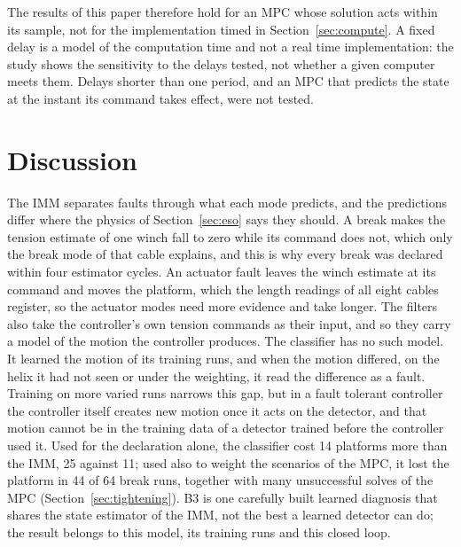 \documentclass{interact}
\begin{document}
The results of this paper therefore hold for an MPC whose solution acts within its sample, not for the implementation timed in Section~\ref{sec:compute}. A fixed delay is a model of the computation time and not a real time implementation: the study shows the sensitivity to the delays tested, not whether a given computer meets them. Delays shorter than one period, and an MPC that predicts the state at the instant its command takes effect, were not tested.

\section{Discussion}\label{sec:discussion}

The IMM separates faults through what each mode predicts, and the predictions differ where the physics of Section~\ref{sec:eso} says they should. A break makes the tension estimate of one winch fall to zero while its command does not, which only the break mode of that cable explains, and this is why every break was declared within four estimator cycles. An actuator fault leaves the winch estimate at its command and moves the platform, which the length readings of all eight cables register, so the actuator modes need more evidence and take longer. The filters also take the controller's own tension commands as their input, and so they carry a model of the motion the controller produces. The classifier has no such model. It learned the motion of its training runs, and when the motion differed, on the helix it had not seen or under the weighting, it read the difference as a fault. Training on more varied runs narrows this gap, but in a fault tolerant controller the controller itself creates new motion once it acts on the detector, and that motion cannot be in the training data of a detector trained before the controller used it. Used for the declaration alone, the classifier cost 14 platforms more than the IMM, 25 against 11; used also to weight the scenarios of the MPC, it lost the platform in 44 of 64 break runs, together with many unsuccessful solves of the MPC (Section~\ref{sec:tightening}). B3 is one carefully built learned diagnosis that shares the state estimator of the IMM, not the best a learned detector can do; the result belongs to this model, its training runs and this closed loop.
\end{document}
